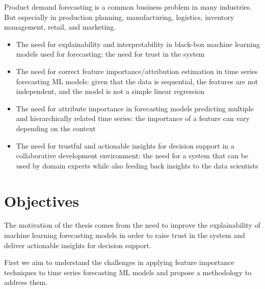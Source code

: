 
Product demand forecasting is a common business problem in many industries.
But especially in production planning, manufacturing, logistics, inventory management, retail, and marketing.

\begin{itemize}
    \item The need for explainability and interpretability in black-box machine learning models used for forecasting: the need for trust in the system
    \item The need for correct feature importance/attribution estimation in time series forecasting ML models: given that the data is sequential, the features are not independent, and the model is not a simple linear regression
    \item The need for attribute importance in forecasting models predicting multiple and hierarchically related time series: the importance of a feature can vary depending on the context
    \item The need for trustful and actionable insights for decision support in a collaborative development environment: the need for a system that can be used by domain experts while also feeding back insights to the data scientists
\end{itemize}



\section[Objectives]{Objectives}



The motivation of the thesis comes from the need to improve the explainability of machine learning forecasting models in order to raise trust in the system and deliver actionable insights for decision support.

First we aim to understand the challenges in applying feature importance techniques to time series forecasting ML models and propose a methodology to address them.

